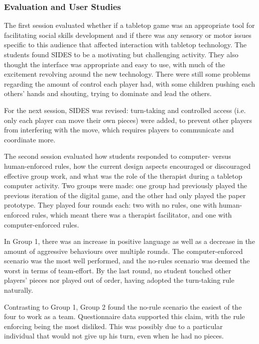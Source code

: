 \documentclass[runningheads]{llncs}
\begin{document}
\subsubsection{Evaluation and User Studies}
\par The first session evaluated whether if a tabletop game was an appropriate tool for facilitating social skills development and if there was any sensory or motor issues specific to this audience that affected interaction with tabletop technology. The students found SIDES to be a motivating but challenging activity. They also thought the interface was appropriate and easy to use, with much of the excitement revolving around the new technology. There were still some problems regarding the amount of control each player had, with some children pushing each others' hands and shouting, trying to dominate and lead the others.
\par For the next session, SIDES was revised: turn-taking and controlled access (i.e. only each player can move their own pieces) were added, to prevent other players from interfering with the move, which requires players to communicate and coordinate more.
\par The second session evaluated how students responded to computer- versus human-enforced rules, how the current design aspects encouraged or discouraged effective group work, and what was the role of the therapist during a tabletop computer activity. Two groups were made: one group had previously played the previous iteration of the digital game, and the other had only played the paper prototype. They played four rounds each: two with no rules, one with human-enforced rules, which meant there was a therapist facilitator, and one with computer-enforced rules.
\par In Group 1, there was an increase in positive language as well as a decrease in the amount of aggressive behaviours over multiple rounds. The computer-enforced scenario was the most well performed, and the no-rules scenario was deemed the worst in terms of team-effort. By the last round, no student touched other players' pieces nor played out of order, having adopted the turn-taking rule naturally.
\par Contrasting to Group 1, Group 2 found the no-rule scenario the easiest of the four to work as a team. Questionnaire data supported this claim, with the rule enforcing being the most disliked. This was possibly due to a particular individual that would not give up his turn, even when he had no pieces.
\end{document}
